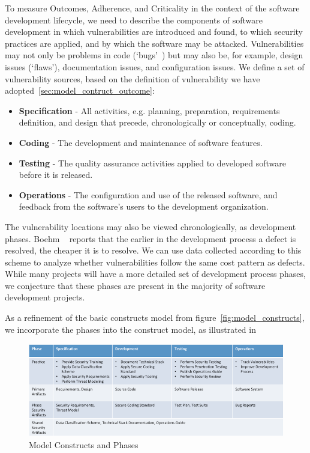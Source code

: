To measure Outcomes, Adherence, and Criticality in the context of the software development lifecycle, we need to describe the components of software development in which vulnerabilities are introduced and found, to which security practices are applied, and by which the software may be attacked.   Vulnerabilities may not only be problems in code (`bugs'~\cite{mcgraw2006software}) but may also be, for example, design issues (`flaws'), documentation issues, and configuration issues. We define a set of vulnerability sources, based on the definition of vulnerability we have adopted~\ref{sec:model_contruct_outcome}:  
 \begin{itemize}
 	\item \textbf{Specification} - All activities, e.g. planning, preparation, requirements definition, and design that precede, chronologically or conceptually, coding. 
 	\item \textbf{Coding} - The development and maintenance of software features.
 	\item \textbf{Testing} - The quality assurance activities applied to developed software before it is released.
 	\item \textbf{Operations} - The configuration and use of the released software, and feedback from the software's users to the development organization.
 \end{itemize} 
The vulnerability locations may also be viewed chronologically, as development phases. Boehm ~\cite{boehm1981economics} reports that the earlier in the development process a defect is resolved, the cheaper it is to resolve. We can use data collected according to this scheme to analyze whether vulnerabilities follow the same cost pattern as defects. While many projects will have a more detailed set of development process phases, we conjecture that these phases are present in the majority of software development projects.

As a refinement of the basic constructs model from figure~\ref{fig:model_constructs}, we incorporate the phases into the construct model, as illustrated in \label{fig:model_constructs_phases}

\begin{figure}
	\includegraphics[width=\columnwidth]{PracticesDiagram}
	\caption{Model Constructs and Phases}
	\label{fig:model_constructs_phases}
\end{figure}


